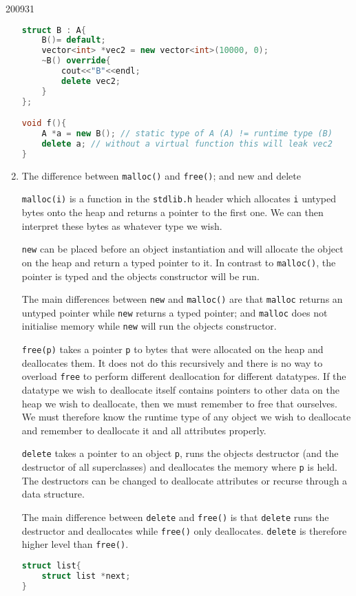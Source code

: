 \documentclass[10pt,\jkfside,a4paper]{article}
\begin{document}
\begin{examquestion}{2009}{3}{1}
\begin{enumerate}[label=(\alph*)]
\begin{lstlisting}[language=C++]
struct B : A{
    B()= default;
    vector<int> *vec2 = new vector<int>(10000, 0);
    ~B() override{
        cout<<"B"<<endl;
        delete vec2;
    }
};

void f(){
	A *a = new B(); // static type of A (A) != runtime type (B)
	delete a; // without a virtual function this will leak vec2
}
\end{lstlisting}

\item The difference between \texttt{malloc()} and \texttt{free()}; and new and delete

\texttt{malloc(i)} is a function in the \texttt{stdlib.h} header
which allocates \texttt{i} untyped bytes onto the heap and returns a
pointer to the first one. We can then interpret these bytes as whatever
type we wish.

\texttt{new} can be placed before an object instantiation and will allocate
the object on the heap and return a typed pointer to it. In contrast to
\texttt{malloc()}, the pointer is typed and the objects constructor will be
run.

The main differences between \texttt{new} and \texttt{malloc()} are that
\texttt{malloc} returns an untyped pointer while \texttt{new} returns a
typed pointer; and \texttt{malloc} does not initialise memory while
\texttt{new} will run the objects constructor.

\texttt{free(p)} takes a pointer \texttt{p} to bytes that were allocated on
the heap and deallocates them. It does not do this recursively and there is
no way to overload \texttt{free} to perform different deallocation for
different datatypes. If the datatype we wish to deallocate itself contains
pointers to other data on the heap we wish to deallocate, then we must
remember to free that ourselves. We must therefore know the runtime type of
any object we wish to deallocate and remember to deallocate it and all
attributes properly.

\texttt{delete} takes a pointer to an object \texttt{p}, runs the objects
destructor (and the destructor of all superclasses) and deallocates the
memory where \texttt{p} is held. The destructors can be changed to
deallocate attributes or recurse through a data structure.

The main difference between \texttt{delete} and \texttt{free()} is that
\texttt{delete} runs the destructor and deallocates while \texttt{free()}
only deallocates. \texttt{delete} is therefore higher level than
\texttt{free()}.

\begin{lstlisting}[language=C]
struct list{
	struct list *next;
}


\end{lstlisting}
\end{enumerate}
\end{examquestion}
\end{document}
